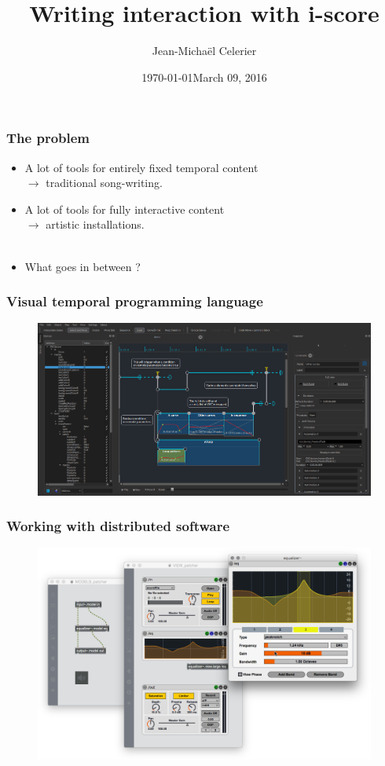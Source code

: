 \documentclass{beamer}
\title{Writing interaction with i-score}
\date{\today}
\author{Jean-Michaël Celerier}
\institute{LaBRI}
\date{March 09, 2016}
\begin{document}
	\maketitle
	
	\begin{frame}
		\frametitle{The problem}
		\Large
		\begin{itemize}
			\item<1-> A lot of tools for entirely fixed temporal content \\ $\rightarrow$ traditional song-writing.
			\item<2-> A lot of tools for fully interactive content  \\  $\rightarrow$ artistic installations.~\\~\\
			\item<3-> What goes in between ?    	
		\end{itemize}    
	\end{frame}
	
	\begin{frame}
		\frametitle{Visual temporal programming language}
		\begin{figure}
			\centering
			\includegraphics[width=\textwidth]{images/iscore.png}
		\end{figure}
	\end{frame}
	
	\begin{frame}
		\frametitle{Working with distributed software}
		\begin{figure}
			\centering
			\includegraphics[width=\textwidth]{images/jamoma.jpg}
		\end{figure}
	\end{frame}
	
\end{document}
